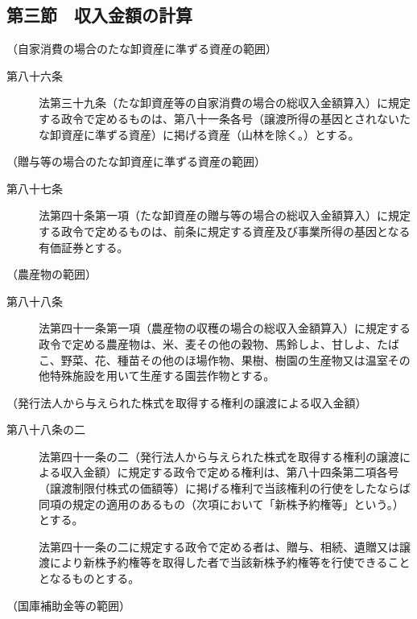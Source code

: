 \documentclass[twocolumn,a4j,10pt]{ltjtarticle}
\begin{document}
\subsection*{第三節　収入金額の計算}
\noindent\hspace{10pt}（自家消費の場合のたな卸資産に準ずる資産の範囲）
\begin{description}
\item[第八十六条]法第三十九条（たな卸資産等の自家消費の場合の総収入金額算入）に規定する政令で定めるものは、第八十一条各号（譲渡所得の基因とされないたな卸資産に準ずる資産）に掲げる資産（山林を除く。）とする。
\end{description}
\noindent\hspace{10pt}（贈与等の場合のたな卸資産に準ずる資産の範囲）
\begin{description}
\item[第八十七条]法第四十条第一項（たな卸資産の贈与等の場合の総収入金額算入）に規定する政令で定めるものは、前条に規定する資産及び事業所得の基因となる有価証券とする。
\end{description}
\noindent\hspace{10pt}（農産物の範囲）
\begin{description}
\item[第八十八条]法第四十一条第一項（農産物の収穫の場合の総収入金額算入）に規定する政令で定める農産物は、米、麦その他の穀物、馬鈴しよ、甘しよ、たばこ、野菜、花、種苗その他のほ場作物、果樹、樹園の生産物又は温室その他特殊施設を用いて生産する園芸作物とする。
\end{description}
\noindent\hspace{10pt}（発行法人から与えられた株式を取得する権利の譲渡による収入金額）
\begin{description}
\item[第八十八条の二]法第四十一条の二（発行法人から与えられた株式を取得する権利の譲渡による収入金額）に規定する政令で定める権利は、第八十四条第二項各号（譲渡制限付株式の価額等）に掲げる権利で当該権利の行使をしたならば同項の規定の適用のあるもの（次項において「新株予約権等」という。）とする。
\item[]法第四十一条の二に規定する政令で定める者は、贈与、相続、遺贈又は譲渡により新株予約権等を取得した者で当該新株予約権等を行使できることとなるものとする。
\end{description}
\noindent\hspace{10pt}（国庫補助金等の範囲）
\end{document}
